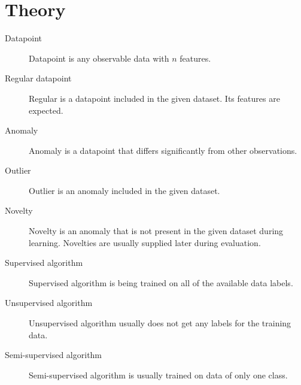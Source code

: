 
\section{Theory}
\label{sec:theory}

\begin{description}
    \item[Datapoint] Datapoint is any observable data with \(n\) features.
    \item[Regular datapoint] Regular is a datapoint included in the given dataset. Its features are expected.
    \item[Anomaly] Anomaly is a datapoint that differs significantly from other observations.
    \item[Outlier] Outlier is an anomaly included in the given dataset.
    \item[Novelty] Novelty is an anomaly that is not present in the given dataset during
learning. Novelties are usually supplied later during evaluation.
    \item[Supervised algorithm] Supervised algorithm is being trained on all of the available data labels.
    \item[Unsupervised algorithm] Unsupervised algorithm usually does not get any labels for the training data.
    \item[Semi-supervised algorithm] Semi-supervised algorithm is usually trained on data of only one class.
\end{description}